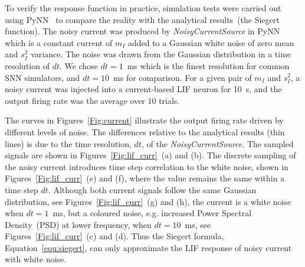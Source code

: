 	To verify the response function in practice, simulation tests were carried out using PyNN~\cite{davison2008pynn} to compare the reality with the analytical results~(the Siegert function).
	The noisy current was produced by \textit{NoisyCurrentSource} in PyNN which is a constant current of $m_I$ added to a Gaussian white noise of zero mean and $s_I^2$ variance.
	The noise was drawn from the Gaussian distribution in a time resolution of $dt$.
	We chose $dt=1$~ms which is the finest resolution for common SNN simulators, and $dt=10$~ms for comparison.
	For a given pair of $m_I$ and $s_I^2$, a noisy current was injected into a current-based LIF neuron for 10~s, and the output firing rate was the average over 10 trials.
	
	The curves in Figures~\ref{Fig:current} illustrate the output firing rate driven by different levels of noise.
	The differences relative to the analytical results (thin lines) is due to the time resolution, $dt$, of the \textit{NoisyCurrentSource}.
	The sampled signals are shown in Figures~\ref{Fig:lif_curr}~(a) and (b).
	The discrete sampling of the noisy current introduces time step correlation to the white noise, shown in Figures~\ref{Fig:lif_curr}~(e) and (f), where the value remains the same within a time step $dt$.
	Although both current signals follow the same Gaussian distribution, see Figures~\ref{Fig:lif_curr}~(g) and (h), the current is a white noise when $dt=1$~ms, but a coloured noise, e.g. increased Power Spectral Density~(PSD) at lower frequency, when $dt=10$~ms, see Figures~\ref{Fig:lif_curr}~(c) and (d).
	Thus the Siegert formula, Equation~\ref{equ:siegert}, can only approximate the LIF response of noisy current with white noise.


